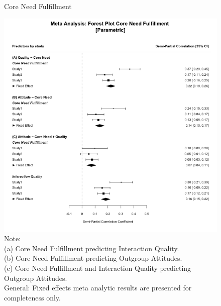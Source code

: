 \documentclass[man, 12pt, a4paper, mask]{apa7}
\theoremstyle{break}
\theoremstyle{plain}
\begin{document}
\begin{figure}
  \caption{Core Need Fulfillment}
  \label{fig:AllportNeedFulfillment}
  \centering\includegraphics[width=\textwidth]{Figures/forestParametricTheoryComb.png}
  \caption*{Note: \\
  (a) Core Need Fulfillment predicting Interaction Quality.\\
  (b) Core Need Fulfillment predicting Outgroup Attitudes.\\
  (c) Core Need Fulfillment and Interaction Quality predicting Outgroup Attitudes.\\
  General: Fixed effects meta analytic results are presented for completeness only.}
\end{figure}
\end{document}
